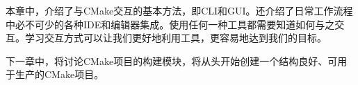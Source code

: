 本章中，介绍了与CMake交互的基本方法，即CLI和GUI。还介绍了日常工作流程中必不可少的各种IDE和编辑器集成。使用任何一种工具都需要知道如何与之交互。学习交互方式可以让我们更好地利用工具，更容易地达到我们的目标。

下一章中，将讨论CMake项目的构建模块，将从头开始创建一个结构良好、可用于生产的CMake项目。